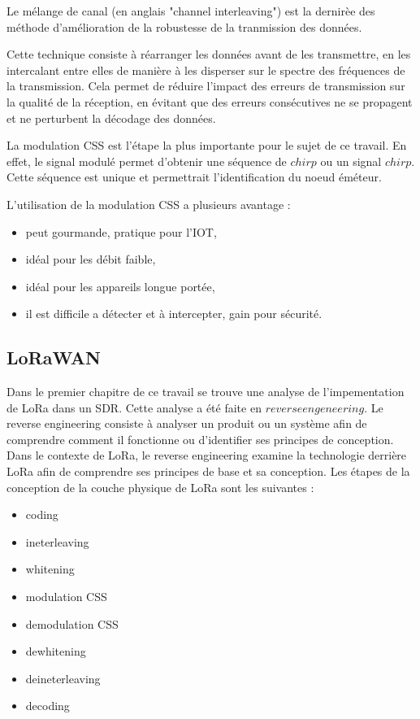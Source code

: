 \documentclass[12pt,a4paper,oneside, titlepage]{report}
\begin{document}
Le mélange de canal (en anglais "channel interleaving") est la dernirèe des méthode d'amélioration de la robustesse de la tranmission des données. 

Cette technique consiste à réarranger les données avant de les transmettre, en les intercalant entre elles de manière à les disperser sur le spectre des fréquences de la transmission. Cela permet de réduire l'impact des erreurs de transmission sur la qualité de la réception, en évitant que des erreurs consécutives ne se propagent et ne perturbent la décodage des données.


La modulation CSS est l'étape la plus importante pour le sujet de ce travail. En effet, le signal modulé permet d'obtenir une séquence de $chirp$ ou un signal $chirp$. Cette séquence est unique et permettrait l'identification du noeud éméteur. 

L'utilisation de la modulation CSS a plusieurs avantage :

\begin{itemize}
\item peut gourmande, pratique pour l'IOT,
\item idéal pour les débit faible,
\item idéal pour les appareils longue portée,
\item il est difficile a détecter et à intercepter, gain pour sécurité.
\end{itemize}


\subsection{LoRaWAN}


Dans le premier chapitre de ce travail se trouve une analyse de l'impementation de LoRa dans un SDR. Cette analyse a été faite en $reverse engeneering$. Le reverse engineering consiste à analyser un produit ou un système afin de comprendre comment il fonctionne ou d'identifier ses principes de conception. Dans le contexte de LoRa, le reverse engineering examine la technologie derrière LoRa afin de comprendre ses principes de base et sa conception. Les étapes de la conception de la couche physique de LoRa sont les suivantes :
\begin{itemize}
\item coding
\item ineterleaving
\item whitening
\item modulation CSS
\item demodulation CSS
\item dewhitening
\item deineterleaving
\item decoding
\end{itemize} 
\end{document}
